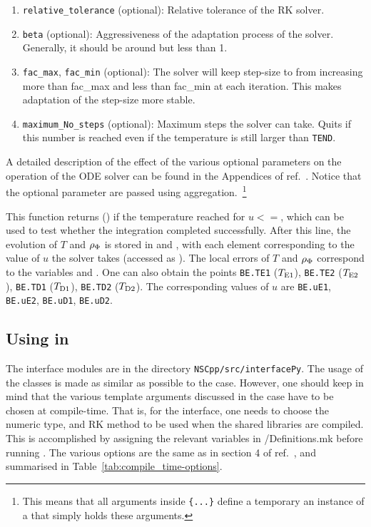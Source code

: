\documentclass[11pt,a4paper]{article}
\begin{document}
\begin{enumerate}
	\item {\tt relative\_tolerance} (optional): Relative tolerance of the RK solver.
	
	\item {\tt beta} (optional): Aggressiveness of the adaptation process of the solver. Generally, it should be around but less than 1.
	
	\item {\tt fac\_max},  {\tt fac\_min} (optional): The solver will keep step-size to from increasing more than fac\_max and less than fac\_min at each iteration. This makes adaptation of the step-size more stable.
	
	\item {\tt maximum\_No\_steps} (optional): Maximum steps the solver can take. Quits if this number is reached even if the temperature is still larger than {\tt TEND}. 
\end{enumerate}
%
A detailed description of the  effect of the various optional parameters on the operation of the ODE solver can be found in the Appendices of ref.~\cite{Karamitros:2021nxi}. Notice that the optional parameter are passed using aggregation.~\footnote{This means that all arguments inside {\tt \{...\}} define a temporary an instance of a  that simply holds these arguments.} 


This function returns  () if the temperature reached  for $u<=$, which can be used to test whether the integration completed successfully.
%
After this line, the evolution of $T$ and $\rho_{\Phi}$ is stored in  and , with each element corresponding to the value of $u$ the solver takes (accessed as ). The local errors of $T$ and $\rho_{\Phi}$ correspond to the variables  and . 
%
One can also obtain the points {\tt BE.TE1} ($T_{\rm E1}{}$), {\tt BE.TE2} ($T_{\rm E2}{}$), {\tt BE.TD1} ($T_{\rm D1}{}$), {\tt BE.TD2} ($T_{\rm D2}{}$). The corresponding values of $u$ are {\tt BE.uE1}, {\tt BE.uE2}, {\tt BE.uD1}, {\tt BE.uD2}.

\subsection{Using \nsc in \PY}\label{sec:py_usage}
%
The \PY interface modules are in the directory {\tt NSCpp/src/interfacePy}. The usage of the classes is made as similar as possible to the \CPP case. However, one should keep in mind that the various template arguments discussed in the \CPP case have to be chosen at compile-time. That is, for the \PY interface, one needs to choose the numeric type, and RK method to be used when the shared libraries are compiled. This is accomplished by assigning the relevant variables in {\nsc/Definitions.mk} before running . The various options are the same as in section 4 of ref.~\cite{Karamitros:2021nxi}, and summarised in Table~\ref{tab:compile_time-options}.
\end{document}
